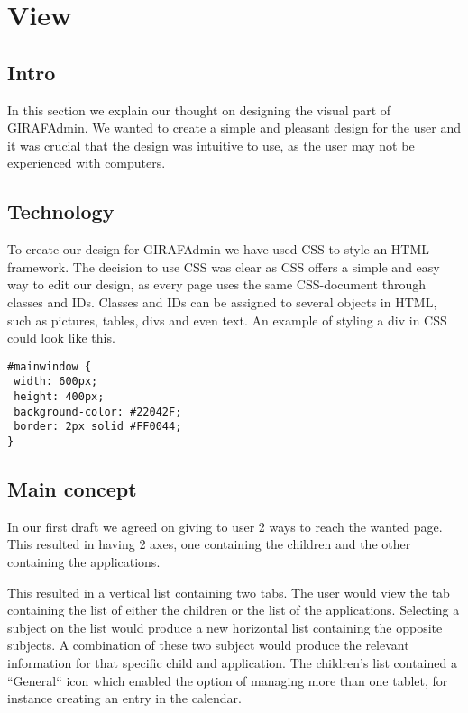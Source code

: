 \section*{View}
\label{label}
\subsection{Intro}
In this section we explain our thought on designing the visual part of GIRAFAdmin. We wanted to create a simple and pleasant design for the user and it was crucial that the design was intuitive to use, as the user may not be experienced with computers. 


\subsection{Technology}
To create our design for GIRAFAdmin we have used CSS to style an HTML framework. The decision to use CSS was clear as CSS offers a simple and easy way to edit our design, as every page uses the same CSS-document through classes and IDs. Classes and IDs can be assigned to several objects in HTML, such as pictures, tables, divs and even text. An example of styling a div in CSS could look like this. 

\begin{verbatim}
#mainwindow {	
 width: 600px;
 height: 400px;
 background-color: #22042F;
 border: 2px solid #FF0044;
}
\end{verbatim}


\subsection{Main concept}
In our first draft we agreed on giving to user 2 ways to reach the wanted page. This resulted in having 2 axes, one containing the children and the other containing the applications. 


This resulted in a vertical list containing two tabs. The user would view the tab containing the list of either the children or the list of the applications. Selecting a subject on the list would produce a new horizontal list containing the opposite subjects. A combination of these two subject would produce the relevant information for that specific child and application.
The children's list contained a ``General`` icon which enabled the option of managing more than one tablet, for instance creating an entry in the calendar. 

